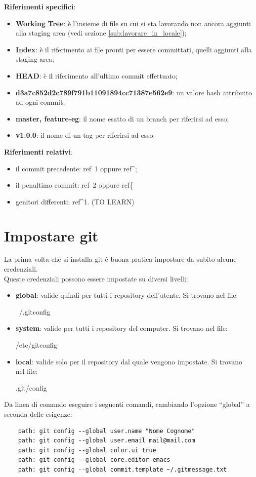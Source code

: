 \textbf{Riferimenti specifici}:
	\begin{itemize}
		\item \textbf{Working Tree}: è l'insieme di file su cui si sta lavorando non ancora aggiunti alla staging area (vedi sezione \ref{sub:lavorare_in_locale});
		\item \textbf{Index}: è il riferimento ai file pronti per essere committati, quelli aggiunti alla staging area;
		\item \textbf{HEAD}: è il riferimento all'ultimo commit effettuato;
		\item \textbf{d3a7c852d2c789f791b11091894cc71387e562e9}: un valore hash attribuito ad ogni commit;
		\item \textbf{master, feature-eg}: il nome esatto di un branch per riferirsi ad esso;
		\item \textbf{v1.0.0}: il nome di un tag per riferirsi ad esso.
	\end{itemize}
	\noindent
\textbf{Riferimenti relativi}:
	\begin{itemize}
		\item il commit precedente: ref~1 oppure ref^;
		\item il penultimo commit: ref~2 oppure ref^^;
		\item genitori differenti: ref^1. (TO LEARN)
	\end{itemize}



\newpage \clearpage
\section{Impostare git} %
\label{sec:impostare_git}
La prima volta che si installa git è buona pratica impostare da subito alcune credenziali. \\
Queste credenziali possono essere impostate su diversi livelli:
	\begin{itemize}
		\item \textbf{global}: valide quindi per tutti i repository dell'utente. Si trovano nel file:
			\begin{center}
				~/.gitconfig
			\end{center}
		\item \textbf{system}: valide per tutti i repository del computer. Si trovano nel file:
			\begin{center}
				/etc/gitconfig
			\end{center}
		\item \textbf{local}: valide solo per il repository dal quale vengono impostate. Si trovano nel file:
			\begin{center}
				.git/config
			\end{center}
	\end{itemize}
Da linea di comando eseguire i seguenti comandi, cambiando l'opzione ``global'' a seconda delle esigenze:
	\begin{verbatim}
	path: git config --global user.name "Nome Cognome"
	path: git config --global user.email mail@mail.com
	path: git config --global color.ui true
	path: git config --global core.editor emacs
	path: git config --global commit.template ~/.gitmessage.txt
	\end{verbatim}

